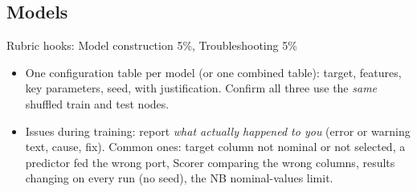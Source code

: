 \documentclass[11pt,a4paper]{article}
\begin{document}
\subsection{Models}
\begin{rubric}{Rubric hooks: Model construction 5\%, Troubleshooting 5\%}
\begin{itemize}
  \item One configuration table per model (or one combined table): target, features, key parameters,
        seed, with justification. Confirm all three use the \emph{same} shuffled train and test nodes.
  \item Issues during training: report \emph{what actually happened to you} (error or warning text,
        cause, fix). Common ones: target column not nominal or not selected, a predictor fed the wrong
        port, Scorer comparing the wrong columns, results changing on every run (no seed), the NB
        nominal-values limit.
\end{itemize}
\end{rubric}
\end{document}

